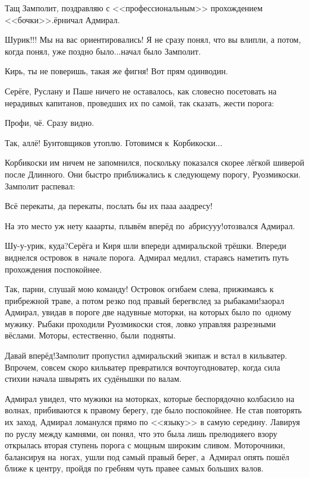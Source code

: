 \diagdash Тащ Замполит, поздравляю с <<профессиональным>> прохождением <<бочки>>.\mdash ёрничал Адмирал.

\diagdash Шурик!!! Мы на вас ориентировались! Я не сразу понял, что вы влипли, а потом, когда понял, уже поздно было$\ldots$\mdash начал было Замполит.

\diagdash Кирь, ты не поверишь, такая же фигня! Вот прям один\sdash в\sdash один.

Серёге, Руслану и Паше ничего не оставалось, как словесно посетовать на нерадивых капитанов, проведших их по самой, так сказать, жести порога:

\diagdash Профи, чё. Сразу видно.

\diagdash Так, аллё! Бунтовщиков утоплю. Готовимся к~Корбикоски$\ldots$

Корбикоски им ничем не запомнился, поскольку показался скорее лёгкой шиверой после Длинного. Они быстро приближались к следующему порогу, Руозмикоски. Замполит распевал:

\diagdash Всё перекаты, да перекаты, послать бы их па\sdash а\sdash а а\sdash а\sdash адресу!

\diagdash На это место уж нету ка\sdash а\sdash арты, плывём вперёд по~абрису\sdash у\sdash у!\mdash отозвался Адмирал.

\diagdash Шу-у-урик, куда?\mdash Серёга и Киря шли впереди адмиральской трёшки. Впереди виднелся островок в~начале порога. Адмирал медлил, стараясь наметить путь прохождения поспокойнее.

\diagdash Так, парни, слушай мою команду! Островок огибаем слева, прижимаясь к прибрежной траве, а потом резко под правый берег\mdash вслед за рыбаками!\mdash заорал Адмирал, увидав в пороге две надувные моторки, на которых было по~одному мужику. Рыбаки проходили Руозмикоски стоя, ловко управляя разрезными вёслами. Моторы, естественно, были~подняты.

\diagdash Давай вперёд!\mdash Замполит пропустил адмиральский экипаж и встал в кильватер. Впрочем, совсем скоро кильватер превратился во\sdash что\sdash угодно\sdash ватер, когда сила стихии начала швырять их судёнышки по валам.

Адмирал увидел, что мужики на моторках, которые беспорядочно колбасило на волнах, прибиваются к правому берегу, где было поспокойнее. Не став повторять их заход, Адмирал ломанулся прямо по <<языку>> в самую середину. Лавируя по руслу между камнями, он понял, что это была лишь прелюдия\mdash его взору открылась вторая ступень порога с мощным широким сливом. Моторочники, балансируя на~ногах, ушли под самый правый берег, а~Адмирал опять пошёл ближе к центру, пройдя по гребням чуть правее самых больших валов. 

